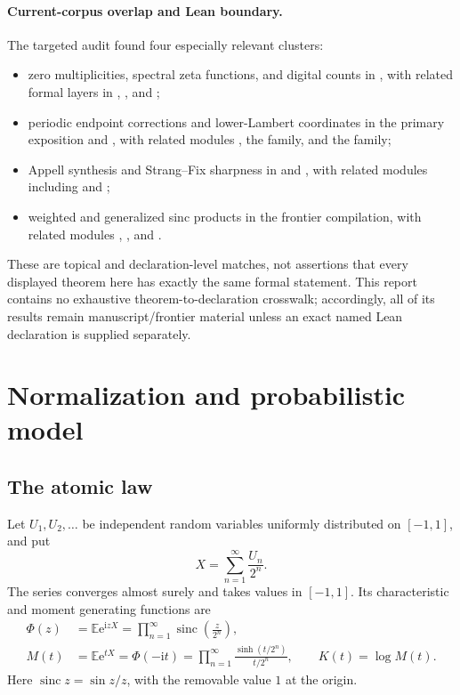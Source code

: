 \documentclass[11pt,oneside]{article}
\theoremstyle{definition}
\theoremstyle{remark}
\newcommand{\sinc}{\operatorname{sinc}}
\newcommand{\e}{\mathrm e}
\newcommand{\ii}{\mathrm i}
\newcommand{\E}{\mathbb E}
\begin{document}
\paragraph{Current-corpus overlap and Lean boundary.}
The targeted audit found four especially relevant clusters:
\begin{itemize}[leftmargin=2em]
\item zero multiplicities, spectral zeta functions, and digital counts in
      , with related formal layers in
      ,
      , and
      ;
\item periodic endpoint corrections and lower-Lambert coordinates in the
      primary exposition and , with related
      modules , the
       family, and the
       family;
\item Appell synthesis and Strang--Fix sharpness in
       and
      , with related modules including
       and
      ;
\item weighted and generalized sinc products in the frontier compilation,
      with related modules ,
      , and
      .
\end{itemize}
These are topical and declaration-level matches, not assertions that every
displayed theorem here has exactly the same formal statement.  This report
contains no exhaustive theorem-to-declaration crosswalk; accordingly, all of
its results remain manuscript/frontier material unless an exact named Lean
declaration is supplied separately.

\section{Normalization and probabilistic model}

\subsection{The atomic law}

Let \(U_1,U_2,\ldots\) be independent random variables uniformly distributed
on \([-1,1]\), and put
\begin{equation}
 X=\sum_{n=1}^{\infty}\frac{U_n}{2^n}.
 \label{eq:X}
\end{equation}
The series converges almost surely and takes values in \([-1,1]\).  Its
characteristic and moment generating functions are
\begin{align}
 \Phi(z)
   &=\E \e^{\ii zX}
     =\prod_{n=1}^{\infty}
       \sinc\!\left(\frac{z}{2^n}\right),
 \label{eq:Phi-def}\\
 M(t)
   &=\E \e^{tX}
     =\Phi(-\ii t)
     =\prod_{n=1}^{\infty}
       \frac{\sinh(t/2^n)}{t/2^n},
 \qquad
 K(t)=\log M(t).
 \label{eq:M-def}
\end{align}
Here \(\sinc z=\sin z/z\), with the removable value \(1\) at the origin.
\end{document}

